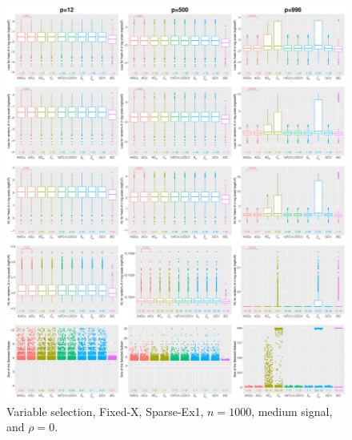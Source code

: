 \begin{figure}[!ht]
\centering
\includegraphics[width=\textwidth]{figures/supplement/fixedx/subset_selection/Sparse-Ex1_n1000_msnr_rho0.eps}
\caption{Variable selection, Fixed-X, Sparse-Ex1, $n=1000$, medium signal, and $\rho=0$.}
\end{figure}
\clearpage
